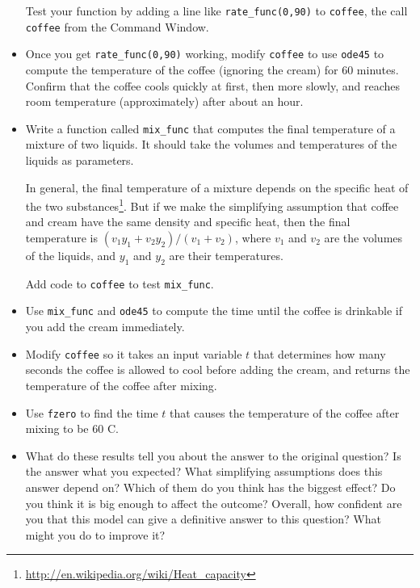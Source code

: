 \documentclass{book}
\begin{document}
\begin{ex}
\begin{itemize}
Test your function by adding a line like {\tt rate\_func(0,90)}
to {\tt coffee}, the call {\tt coffee} from the Command Window.

\item Once you get {\tt rate\_func(0,90)} working, modify
{\tt coffee} to use {\tt ode45} to compute the temperature
of the coffee (ignoring the cream) for 60 minutes. Confirm that
the coffee cools quickly at first, then more slowly, and reaches
room temperature (approximately) after about an hour.

\item Write a function called {\tt mix\_func} that computes
the final temperature of a mixture of two liquids. It should
take the volumes and temperatures of the liquids as parameters.

In general, the final temperature of a mixture depends on the specific
heat of the two
substances\footnote{\url{http://en.wikipedia.org/wiki/Heat_capacity}}.
But if we make the simplifying assumption that coffee and cream
have the same density and specific heat, then the final temperature is
$(v_1 y_1 + v_2 y_2) / (v_1 + v_2)$, where $v_1$ and $v_2$ are
the volumes of the liquids, and $y_1$ and $y_2$ are their
temperatures.

Add code to {\tt coffee} to test {\tt mix\_func}.

\item Use {\tt mix\_func} and {\tt ode45} to compute the
time until the coffee is drinkable if you add the cream
immediately.

\item Modify {\tt coffee} so it takes an input variable $t$ that
determines how many seconds the coffee is allowed to cool before
adding the cream, and returns the temperature of the coffee
after mixing.

\item Use {\tt fzero} to find the time $t$ that causes the
temperature of the coffee after mixing to be 60 \degree C.

\item What do these results tell you about the answer to the original
question? Is the answer what you expected? What simplifying
assumptions does this answer depend on? Which of them do you think
has the biggest effect? Do you think it is big enough to affect the
outcome? Overall, how confident are you that this model can give
a definitive answer to this question? What might you do to improve
it?

\end{itemize}

\end{ex}
\end{document}
